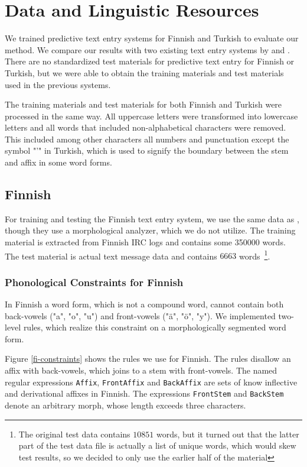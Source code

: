 \documentclass{llncs}
\begin{document}
\section{Data and Linguistic Resources}\label{data}

We trained predictive text entry systems for Finnish and Turkish to
evaluate our method. We compare our results with two existing text
entry systems by \cite{silfverberg/2011/cla} and
\cite{Tantug:2010}. There are no standardized test materials for
predictive text entry for Finnish or Turkish, but we were able to
obtain the training materials and test materials used in the previous
systems.

The training materials and test materials for both Finnish and Turkish
were processed in the same way. All uppercase letters were transformed
into lowercase letters and all words that included non-alphabetical
characters were removed. This included among other characters all
numbers and punctuation except the symbol "'" in Turkish, which is
used to signify the boundary between the stem and affix in some word
forms.

\subsection{Finnish}

For training and testing the Finnish text entry system, we use the
same data as \cite{silfverberg/2011/cla}, though they use a
morphological analyzer, which we do not utilize. The training material
is extracted from Finnish IRC logs and contains some 350000 words. The
test material is actual text message data and contains $6663$
words~\footnote{The original test data contains $10851$ words, but it
  turned out that the latter part of the test data file is actually a
  list of unique words, which would skew test results, so we decided
  to only use the earlier half of the material}.

\subsubsection{Phonological Constraints for Finnish}

In Finnish a word form, which is not a compound word, cannot contain
both back-vowels ("a", "o", "u") and front-vowels ("ä", "ö", "y"). We
implemented two-level rules, which realize this constraint on a
morphologically segmented word form.

Figure \ref{fi-constraints} shows the rules we use for Finnish. The
rules disallow an affix with back-vowels, which joins to a stem with
front-vowels. The named regular expressions \verb|Affix|,
\verb|FrontAffix| and \verb|BackAffix| are sets of know inflective and
derivational affixes in Finnish. The expressions \verb|FrontStem| and
\verb|BackStem| denote an arbitrary morph, whose length exceeds three
characters.
\end{document}
